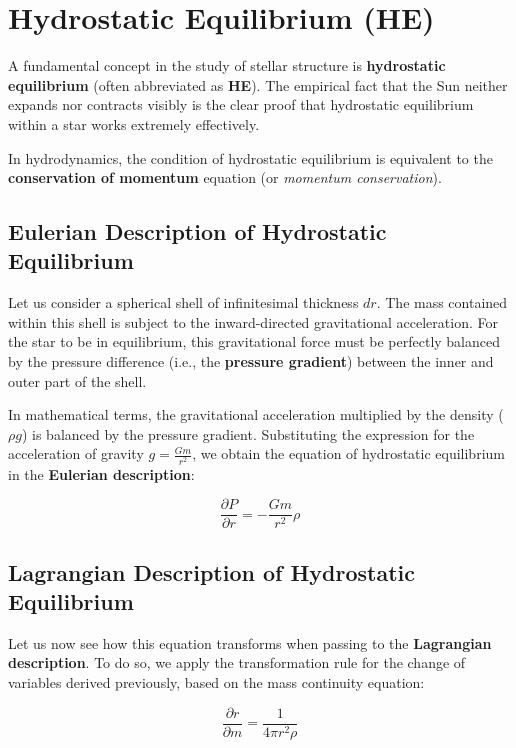 \section{Hydrostatic Equilibrium (HE)}

A fundamental concept in the study of stellar structure is \textbf{hydrostatic equilibrium} (often abbreviated as \textbf{HE}). The empirical fact that the Sun neither expands nor contracts visibly is the clear proof that hydrostatic equilibrium within a star works extremely effectively.

In hydrodynamics, the condition of hydrostatic equilibrium is equivalent to the \textbf{conservation of momentum} equation (or \textit{momentum conservation}).

\subsection{Eulerian Description of Hydrostatic Equilibrium}

Let us consider a spherical shell of infinitesimal thickness $dr$. The mass contained within this shell is subject to the inward-directed gravitational acceleration. For the star to be in equilibrium, this gravitational force must be perfectly balanced by the pressure difference (i.e., the \textbf{pressure gradient}) between the inner and outer part of the shell.

In mathematical terms, the gravitational acceleration multiplied by the density ($\rho g$) is balanced by the pressure gradient. Substituting the expression for the acceleration of gravity $g = \frac{Gm}{r^2}$, we obtain the equation of hydrostatic equilibrium in the \textbf{Eulerian description}:

\begin{equation}
\frac{\partial P}{\partial r} = -\frac{G m}{r^2} \rho
\end{equation}

\subsection{Lagrangian Description of Hydrostatic Equilibrium}

Let us now see how this equation transforms when passing to the \textbf{Lagrangian description}. To do so, we apply the transformation rule for the change of variables derived previously, based on the mass continuity equation:

\begin{equation}
\frac{\partial r}{\partial m} = \frac{1}{4\pi r^2 \rho}
\end{equation}

